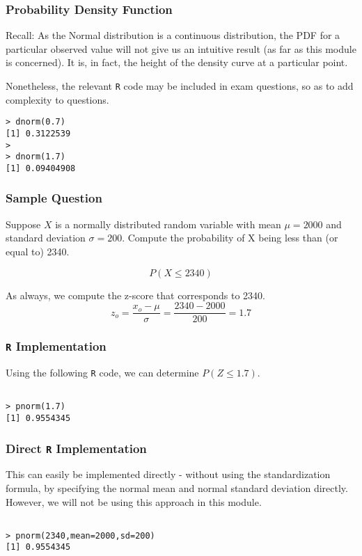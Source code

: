 

\begin{frame}[fragile]
\frametitle{Probability Density Function}
Recall: As the Normal distribution is a continuous distribution, the PDF for a particular observed value will not give us an intuitive
result (as far as this module is concerned). It is, in fact, the height of the density curve at a particular point.

Nonetheless, the relevant \texttt{R} code may be included in exam questions, so as to add complexity to questions.

\begin{verbatim}
> dnorm(0.7)
[1] 0.3122539
>
> dnorm(1.7)
[1] 0.09404908

\end{verbatim}
\end{frame}
\begin{frame}[fragile]
\frametitle{Sample Question}
Suppose $X$ is a normally distributed random variable with mean $\mu = 2000$ and standard deviation $\sigma=200$.
Compute the probability of X being less than (or equal to) 2340.

\[P(X \leq 2340)\]

As always, we compute the z-score that corresponds to 2340.
\[ z_o = \frac{x_o - \mu}{\sigma}  = \frac{2340-2000}{200} = 1.7\]
\end{frame}

\begin{frame}[fragile]
\frametitle{\texttt{R} Implementation}


Using the following \texttt{R} code, we can determine $P(Z \leq 1.7)$.
\begin{verbatim}

> pnorm(1.7)
[1] 0.9554345

\end{verbatim}
\end{frame}


\begin{frame}[fragile]
\frametitle{Direct \texttt{R} Implementation}

This can easily be implemented directly - without using the standardization formula, by specifying the normal mean and normal standard deviation directly. However, we will not be using this approach in this module.
\begin{verbatim}

> pnorm(2340,mean=2000,sd=200)
[1] 0.9554345


\end{verbatim}
\end{frame}

